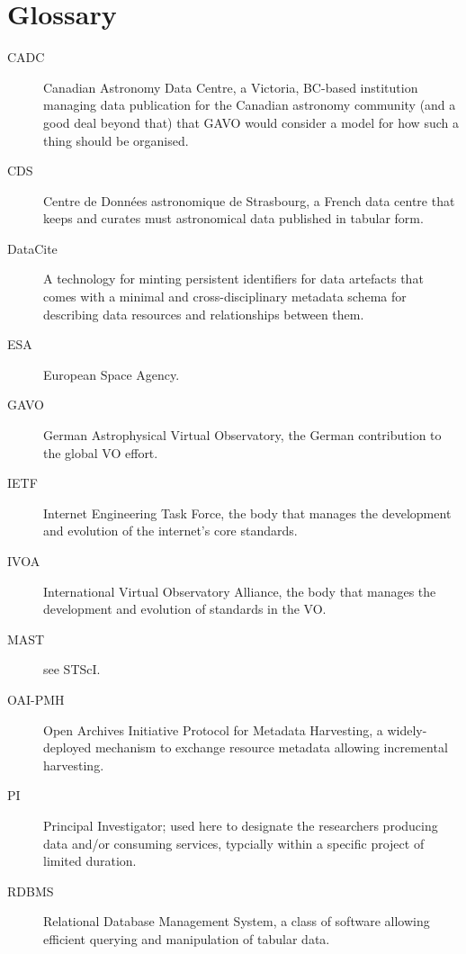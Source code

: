 \section{Glossary}
\label{app:glossary}

\begin{description}
\item[CADC] Canadian Astronomy Data Centre, a Victoria, BC-based
institution managing data publication for the Canadian astronomy
community (and a good deal beyond that) that GAVO would consider a model
for how such a thing should be organised.

\item[CDS] Centre de Donn\'ees astronomique de Strasbourg, a French data
centre that keeps and curates must astronomical data published in
tabular form.

\item[DataCite] A technology for minting persistent identifiers for data
artefacts that comes with a minimal and cross-disciplinary metadata
schema for describing data resources and relationships between them.

\item[ESA] European Space Agency.

\item[GAVO] German Astrophysical Virtual Observatory, the German
contribution to the global VO effort.

\item[IETF] Internet Engineering Task Force, the body that manages the
development and evolution of the internet's core standards.

\item[IVOA] International Virtual Observatory Alliance, the body that
manages the development and evolution of standards in the VO.

\item[MAST] see STScI.

\item[OAI-PMH] Open Archives Initiative Protocol for Metadata
Harvesting, a widely-deployed mechanism to exchange resource metadata
allowing incremental harvesting.

\item[PI] Principal Investigator; used here to designate the researchers
producing data and/or consuming services, typcially within a specific
project of limited duration.

\item[RDBMS] Relational Database Management System, a class of software
allowing efficient querying and manipulation of tabular data.


\end{description}
